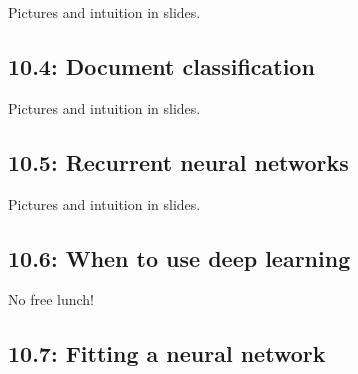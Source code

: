 \documentclass{article}
\begin{document}
Pictures and intuition in slides.

\subsection*{10.4: Document classification}

Pictures and intuition in slides.

\subsection*{10.5: Recurrent neural networks}

Pictures and intuition in slides.

\subsection*{10.6: When to use deep learning}

No free lunch!

\subsection*{10.7: Fitting a neural network}
\end{document}
